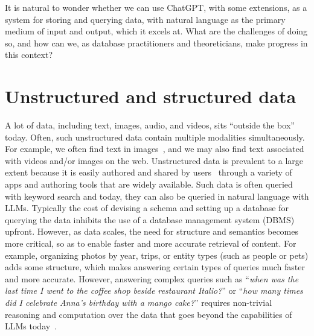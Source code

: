 \documentclass[11pt,dvipdfm]{article}
\begin{document}
It is natural to wonder whether we can use ChatGPT, with some extensions, as a system for storing and querying data, with natural language as the primary medium of input and output, which it excels at. What are the challenges of doing so, and how can we, as database practitioners and theoreticians, make progress in this context? 


\section{Unstructured and structured data}
A lot of data, including text, images, audio, and videos, sits ``outside the box'' today. Often, such unstructured data contain multiple modalities simultaneously. For example, we often find text in images~\cite{DBLP:conf/nips/KielaFMGSRT20}, and we may also find text associated with videos and/or images on the web. Unstructured data is prevalent to a large extent because it is easily authored and shared by users~\cite{HalevyCIDR03} through a variety of apps and authoring tools that are widely available.
Such data is often queried with keyword search and today, they can also be queried in natural language with LLMs.
Typically the cost of devising a schema and setting up a database for querying the data inhibits the use of a database management system (DBMS) upfront. However, as data scales, the need for structure and semantics becomes more critical, so as to enable faster and more accurate retrieval of content. 
For example, organizing photos by year, trips, or entity types (such as people or pets) adds some structure, which makes answering certain types of queries much faster and more accurate. However, answering complex queries such as ``{\it when was the last time I went to the coffee shop beside restaurant Italio?}'' or ``{\it how many times did I celebrate Anna's birthday with a mango cake?}'' requires non-trivial reasoning and computation over the data that goes beyond the capabilities of LLMs today~\cite{timelineqa, neuraldb}.
\end{document}
